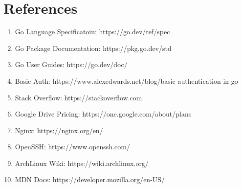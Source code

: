 \documentclass[12pt]{article}
\begin{document}
\section{References}
\vspace{2cm}
\begin{enumerate}
	\item Go Language Specificatoin: \quad https://go.dev/ref/spec
	\item Go Package Documentation: \quad https://pkg.go.dev/std
	\item Go User Guides: \quad https://go.dev/doc/
	\item Basic Auth: \quad https://www.alexedwards.net/blog/basic-authentication-in-go
	\item Stack Overflow: \quad https://stackoverflow.com
	\item Google Drive Pricing: \quad https://one.google.com/about/plans
	\item Nginx: \quad https://nginx.org/en/
	\item OpenSSH: \quad https://www.openssh.com/
	\item ArchLinux Wiki: \quad https://wiki.archlinux.org/
	\item MDN Docs: \quad https://developer.mozilla.org/en-US/
\end{enumerate}


\fi  %
\end{document}
